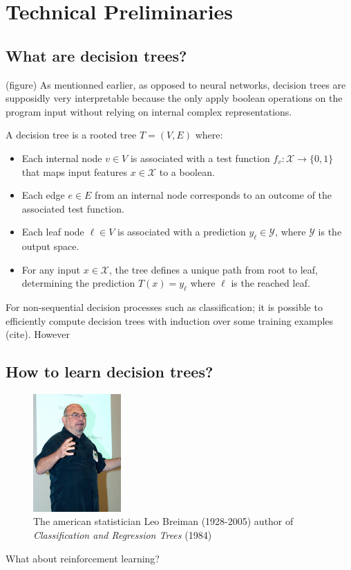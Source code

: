 \section{Technical Preliminaries}
\subsection{What are decision trees?}
(figure)
As mentionned earlier, as opposed to neural networks, decision trees are supposidly very interpretable because the only apply boolean operations on the program input without relying on internal complex representations.
\begin{definition}
A decision tree is a rooted tree $T = (V, E)$ where:
\begin{itemize}
\item Each internal node $v \in V$ is associated with a test function $f_v: \mathcal{X} \rightarrow \{0, 1\}$ that maps input features $x \in \mathcal{X}$ to a boolean.
\item Each edge $e \in E$ from an internal node corresponds to an outcome of the associated test function.
\item Each leaf node $\ell \in V$ is associated with a prediction $y_\ell \in \mathcal{Y}$, where $\mathcal{Y}$ is the output space.
\item For any input $x \in \mathcal{X}$, the tree defines a unique path from root to leaf, determining the prediction $T(x) = y_\ell$ where $\ell$ is the reached leaf.
\end{itemize}
\end{definition}
For non-sequential decision processes such as classification; it is possible to efficiently compute decision trees with induction over some training examples (cite). However 
\subsection{How to learn decision trees?}
\begin{figure}
    \centering
    \includegraphics[width=0.3\textwidth]{images/images_intro/Leo_Breiman.jpg}
    \caption{The american statistician Leo Breiman (1928-2005) author of \textit{Classification and Regression Trees} (1984)}
\end{figure}
What about reinforcement learning?
